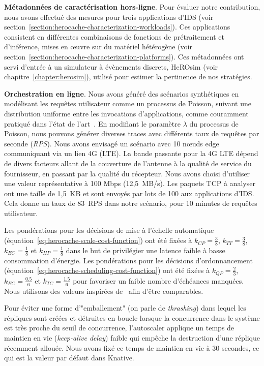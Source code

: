 {\textbf{Métadonnées de caractérisation hors-ligne}. Pour évaluer notre contribution, nous avons effectué des mesures pour trois applications d'\gls{IDS} (voir section~\ref{section:herocache-characterization-workloads}). Ces applications consistent en différentes combinaisons de fonctions de prétraitement et d'inférence, mises en œuvre sur du matériel hétérogène (voir section~\ref{section:herocache-characterization-platforms}). Ces métadonnées ont servi d'entrée à un simulateur à évènements discrets, HeROsim (voir chapitre~\ref{chapter:herosim}), utilisé pour estimer la pertinence de nos stratégies.

\textbf{Orchestration en ligne}. Nous avons généré des scénarios synthétiques en modélisant les requêtes utilisateur comme un processus de Poisson, suivant une distribution uniforme entre les invocations d'applications, comme couramment pratiqué dans l'état de l'art~\cite{9928755}. En modifiant le paramètre $\lambda$ du processus de Poisson, nous pouvons générer diverses traces avec différents taux de requêtes par seconde (\textit{RPS}). Nous avons envisagé un scénario avec 10 nœuds edge communiquant via un lien 4G (LTE). La bande passante pour la 4G LTE dépend de divers facteurs allant de la couverture de l'antenne à la qualité de service du fournisseur, en passant par la qualité du récepteur. Nous avons choisi d'utiliser une valeur représentative à 100 Mbps (12,5~MB/s). Les paquets \gls{TCP} à analyser ont une taille de 1,5~KB et sont envoyés par lots de 100 aux applications d'\gls{IDS}. Cela donne un taux de 83~RPS dans notre scénario, pour 10 minutes de requêtes utilisateur.

Les pondérations pour les décisions de mise à l'échelle automatique (équation~\ref{eq:herocache-scale-cost-function}) ont été fixées à $k_{CP} = \frac{3}{8}$, $k_{TT} = \frac{3}{8}$, $k_{EC} = \frac{1}{8}$ et $k_{HP} = \frac{1}{8}$ dans le but de privilégier une latence faible à basse consommation d'énergie. Les pondérations pour les décisions d'ordonnancement (équation~\ref{eq:herocache-scheduling-cost-function}) ont été fixées à $k_{QP} = \frac{2}{3}$, $k_{EC} = \frac{0.5}{6}$ et $k_{TC} = \frac{1.5}{6}$ pour favoriser un faible nombre d'échéances manquées. Nous utilisons des valeurs inspirées de~\cite{herofake} afin d'être comparables.

Pour éviter une forme d'"emballement" (on parle de \textit{thrashing}) dans lequel les répliques sont créées et détruites en boucle lorsque la concurrence dans le système est très proche du seuil de concurrence, l'autoscaler applique un temps de maintien en vie (\textit{keep-alive delay}) faible qui empêche la destruction d'une réplique récemment allouée. Nous avons fixé ce temps de maintien en vie à 30 secondes, ce qui est la valeur par défaut dans Knative.

}
